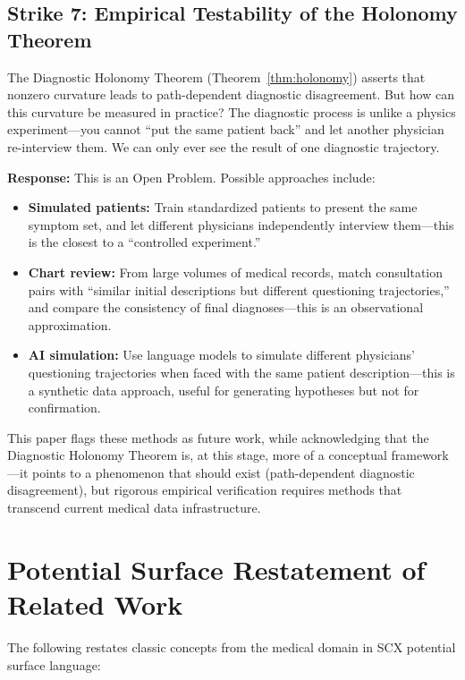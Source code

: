 \documentclass[12pt,a4paper]{article}
\theoremstyle{remark}
\begin{document}
\subsection{Strike 7: Empirical Testability of the Holonomy Theorem}

The Diagnostic Holonomy Theorem (Theorem~\ref{thm:holonomy}) asserts that nonzero curvature leads to path-dependent diagnostic disagreement. But how can this curvature be measured in practice? The diagnostic process is unlike a physics experiment---you cannot ``put the same patient back'' and let another physician re-interview them. We can only ever see the result of one diagnostic trajectory.

\textbf{Response:} This is an Open Problem. Possible approaches include:
\begin{itemize}
    \item \textbf{Simulated patients:} Train standardized patients to present the same symptom set, and let different physicians independently interview them---this is the closest to a ``controlled experiment.''
    \item \textbf{Chart review:} From large volumes of medical records, match consultation pairs with ``similar initial descriptions but different questioning trajectories,'' and compare the consistency of final diagnoses---this is an observational approximation.
    \item \textbf{AI simulation:} Use language models to simulate different physicians' questioning trajectories when faced with the same patient description---this is a synthetic data approach, useful for generating hypotheses but not for confirmation.
\end{itemize}

This paper flags these methods as future work, while acknowledging that the Diagnostic Holonomy Theorem is, at this stage, more of a conceptual framework---it points to a phenomenon that should exist (path-dependent diagnostic disagreement), but rigorous empirical verification requires methods that transcend current medical data infrastructure.

\section{Potential Surface Restatement of Related Work}
\label{sec:related_work}

The following restates classic concepts from the medical domain in SCX potential surface language:
\end{document}
